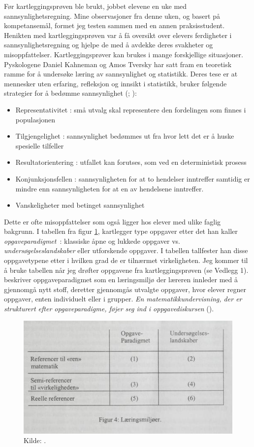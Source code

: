 \documentclass[main.tex]{subfiles}
\begin{document}
Før kartleggingsprøven ble brukt, jobbet elevene en uke med sannsynlighetsregning. Mine observasjoner fra denne uken, 
og basert på kompetansemål, formet jeg testen sammen med en annen praksisstudent. Henikten med kartleggingsprøven 
var å få oversikt over elevers ferdigheter i sannsynlighetsregning og hjelpe de med å avdekke deres
svakheter og misoppfattelser. Kartleggingsprøver kan brukes i mange forskjellige situasjoner. 
Pyskologene Daniel Kahneman og Amos Tversky har satt fram en teoretisk ramme for å undersøke 
læring av sannsynlighet og statistikk. Deres tese er at mennesker uten erfaring, refleksjon og innsikt i statistikk,
bruker følgende strategier for å bedømme sannsynlighet (; ):
\begin{itemize}
\item Representativitet : små utvalg skal representere den fordelingen som finnes i populasjonen
\item Tilgjengelighet : sannsynlighet bedømmes ut fra hvor lett det er å huske spesielle tilfeller
\item Resultatorientering : utfallet kan forutses, som ved en deterministisk prosess
\item Konjunksjonsfellen : sannsynligheten for at to hendelser inntreffer samtidig er mindre enn sannsynligheten
for at en av hendelsene inntreffer.
\item Vanskeligheter med betinget sannsynlighet
\end{itemize}
Dette er ofte misoppfattelser som også ligger hos elever med ulike faglig bakgrunn.
I tabellen fra figur \ref{fig:skov98}, kartlegger  type oppgaver etter det han kaller 
\mbox{\emph{opgaveparadigmet} :}
klassiske åpne og lukkede oppgaver vs. \emph{undersøgelseslandskaber} eller utforskende oppgaver. I tabellen tallfester
han disse oppgavetypene etter i hvilken grad de er tilnærmet virkeligheten. Jeg kommer til å bruke tabellen når jeg
drøfter oppgavene fra kartleggingsprøven (se Vedlegg 1).  beskriver oppgaveparadigmet som
en læringsmiljø der læreren innleder med å gjennomgå nytt stoff, deretter gjennomgås utvalgte oppgaver, hvor elever 
regner oppgaver, enten individuelt eller i grupper. \emph{En matematikkundervisning, der er strukturert efter 
opgaveparadigme, føjer seg ind i \guillemotleft oppgavediskursen\guillemotright} ().
\begin{figure}[h!]
\centering
\includegraphics[scale = 0.9]{../figures/laeringsmiljoer.png}
\caption{Kilde: \protect{}.}
\label{fig:skov98}
\end{figure}
\end{document}
